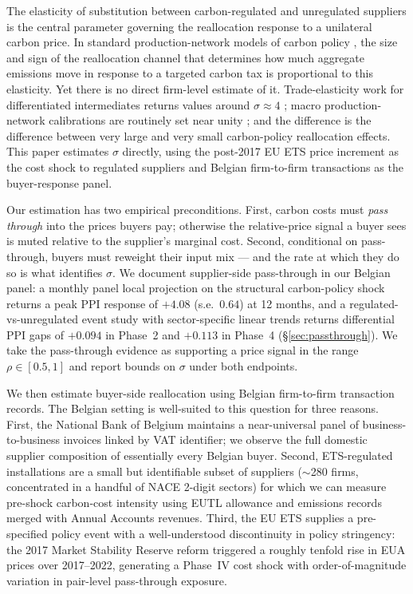 The elasticity of substitution between carbon-regulated and unregulated suppliers is the central parameter governing the reallocation response to a unilateral carbon price. In standard production-network models of carbon policy \citep[e.g.,][]{baqaee2019,king2019,aghion2024}, the size and sign of the reallocation channel that determines how much aggregate emissions move in response to a targeted carbon tax is proportional to this elasticity. Yet there is no direct firm-level estimate of it. Trade-elasticity work for differentiated intermediates returns values around $\sigma \approx 4$ \citep[e.g.,][]{peter2023}; macro production-network calibrations are routinely set near unity \citep{baqaee2019}; and the difference is the difference between very large and very small carbon-policy reallocation effects. This paper estimates $\sigma$ directly, using the post-2017 EU ETS price increment as the cost shock to regulated suppliers and Belgian firm-to-firm transactions as the buyer-response panel.

Our estimation has two empirical preconditions. First, carbon costs must \emph{pass through} into the prices buyers pay; otherwise the relative-price signal a buyer sees is muted relative to the supplier's marginal cost. Second, conditional on pass-through, buyers must reweight their input mix --- and the rate at which they do so is what identifies $\sigma$. We document supplier-side pass-through in our Belgian panel: a monthly panel local projection on the structural carbon-policy shock returns a peak PPI response of $+4.08$ (s.e.\ $0.64$) at 12 months, and a regulated-vs-unregulated event study with sector-specific linear trends returns differential PPI gaps of $+0.094$ in Phase~2 and $+0.113$ in Phase~4 (\S\ref{sec:passthrough}). We take the pass-through evidence as supporting a price signal in the range $\rho \in [0.5, 1]$ and report bounds on $\sigma$ under both endpoints.

We then estimate buyer-side reallocation using Belgian firm-to-firm transaction records. The Belgian setting is well-suited to this question for three reasons. First, the National Bank of Belgium maintains a near-universal panel of business-to-business invoices linked by VAT identifier; we observe the full domestic supplier composition of essentially every Belgian buyer. Second, ETS-regulated installations are a small but identifiable subset of suppliers ($\sim$280 firms, concentrated in a handful of NACE 2-digit sectors) for which we can measure pre-shock carbon-cost intensity using EUTL allowance and emissions records merged with Annual Accounts revenues. Third, the EU ETS supplies a pre-specified policy event with a well-understood discontinuity in policy stringency: the 2017 Market Stability Reserve reform triggered a roughly tenfold rise in EUA prices over 2017--2022, generating a Phase~IV cost shock with order-of-magnitude variation in pair-level pass-through exposure.

